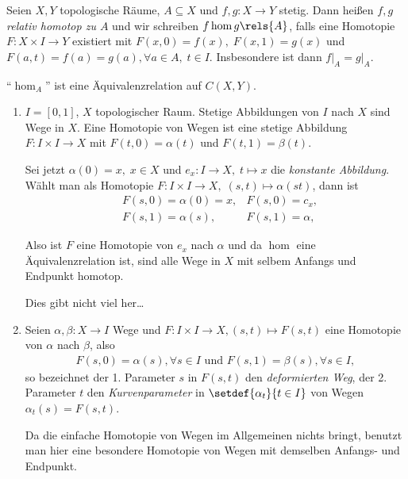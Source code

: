 \begin{prop}[Verallgemeinerung]
\label{prop:3.1.3}
Seien $X,Y$ topologische Räume, $A\subseteq X$ und $f,g: X\to Y$ stetig. Dann
heißen $f,g$ \emph{relativ homotop zu $A$} und wir schreiben $f\hom g\rels{A}$,
falls eine Homotopie $F: X\times I \to Y$ existiert mit $F(x,0) = f(x),\; F(x,1) = g(x)$
und $F(a,t) = f(a) = g(a), \forall a\in A,\; t\in I$. Insbesondere ist dann
$f\big|_A = g\big|_A$.

``$\hom_A$'' ist eine Äquivalenzrelation auf $C(X,Y)$.\fishhere
\end{prop}

\begin{prop}[Spezialfälle]
\begin{enumerate}
  \item $I=[0,1]$, $X$ topologischer Raum. Stetige Abbildungen von $I$ nach $X$
  sind Wege in $X$. Eine Homotopie von Wegen ist eine stetige Abbildung $F:
  I\times I\to X$ mit $F(t,0) = \alpha(t)$ und $F(t,1) = \beta(t)$.
  
  Sei jetzt $\alpha(0) = x,\;x\in X$ und $e_x : I\to X,\;t\mapsto x$ die
  \emph{konstante Abbildung}. Wählt man als Homotopie $F: I\times I \to
  X,\;(s,t)\mapsto\alpha(st)$, dann ist
  \begin{align*}
  & F(s,0) = \alpha(0) = x, & F(s,0) = c_x,\\
  & F(s,1) = \alpha(s), & F(s,1) = \alpha,
  \end{align*}

Also ist $F$ eine Homotopie von $e_x$ nach $\alpha$ und da $\hom$ eine
Äquivalenzrelation ist, sind alle Wege in $X$ mit selbem Anfangs und Endpunkt
homotop.

Dies gibt nicht viel her\ldots
\item Seien $\alpha, \beta: X\to I$ Wege und $F: I\times I \to X,
(s,t)\mapsto F(s,t)$ eine Homotopie von $\alpha$ nach $\beta$, also
\begin{align*}
F(s,0) = \alpha(s), \forall s\in I\text{ und }F(s,1) = \beta(s), \forall s\in I,
\end{align*}
so bezeichnet der 1. Parameter $s$ in $F(s,t)$ den \emph{deformierten Weg}, der
2. Parameter $t$ den \emph{Kurvenparameter} in $\setdef{\alpha_t}{t\in I}$
von Wegen $\alpha_t(s) = F(s,t)$.

Da die einfache Homotopie von Wegen im Allgemeinen nichts bringt, benutzt man
hier eine besondere Homotopie von Wegen mit demselben Anfangs- und Endpunkt.


\end{enumerate}
\end{prop}
